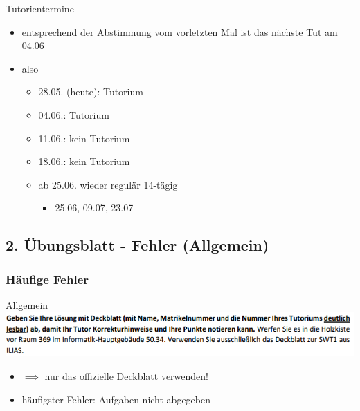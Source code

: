 \documentclass[18pt]{beamer}
\begin{document}
\begin{frame}{Tutorientermine}
	\begin{itemize}
		\item entsprechend der Abstimmung vom vorletzten Mal ist das nächste Tut am 04.06
		\item also
		\begin{itemize}
			\item 28.05. (heute): Tutorium
			\item 04.06.: Tutorium
			\item 11.06.: kein Tutorium
			\item 18.06.: kein Tutorium
			\item ab 25.06. wieder regulär 14-tägig
			\begin{itemize}
				\item 25.06, 09.07, 23.07
			\end{itemize}
		\end{itemize}
	\end{itemize}
\end{frame}
	
\subsection{2. Übungsblatt - Fehler (Allgemein)}
\begin{frame}
		\frametitle{Häufige Fehler}
		\begin{block}{Allgemein}
			\includegraphics[scale=0.6]{./pics/tut2/deckblatt.png}
			\begin{itemize}
				\item $\implies$ nur das offizielle Deckblatt verwenden!
				\pause
				\item häufigster Fehler: Aufgaben nicht abgegeben
			\end{itemize}
		\end{block}
\end{frame}
	
\end{document}
